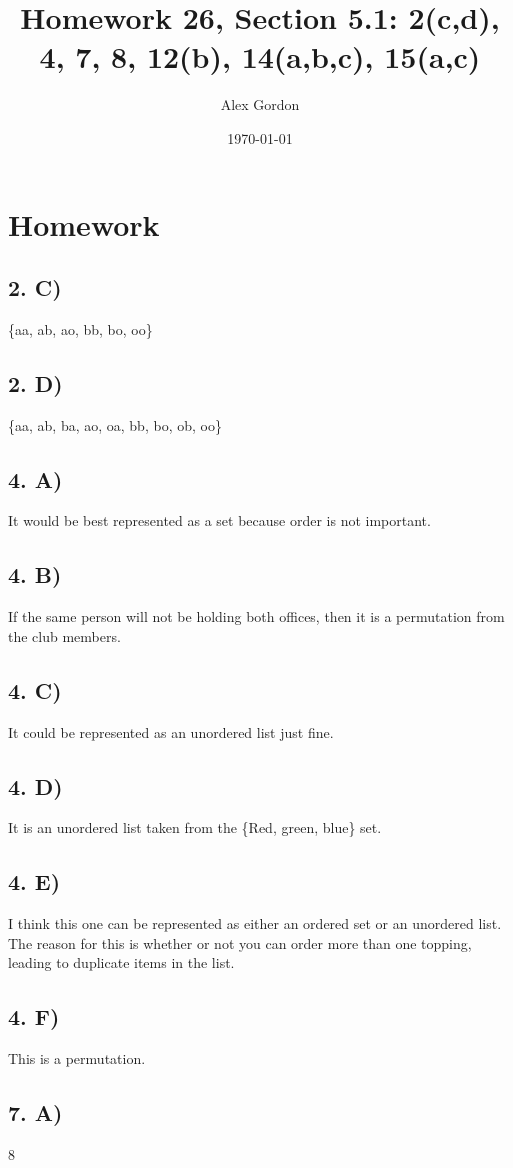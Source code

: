 \documentclass[12]{scrartcl}
\begin{document}
\title{Homework 26, Section 5.1: 2(c,d), 4, 7, 8, 12(b), 14(a,b,c), 15(a,c)}
\author{Alex Gordon}
\date{\today}
\maketitle
\section*{Homework}
\subsection*{2. C)}
\{aa, ab, ao, bb, bo, oo\}
\subsection*{2. D)}
\{aa, ab, ba, ao, oa, bb, bo, ob, oo\}
\subsection*{4. A)}
It would be best represented as a set because order is not important. 
\subsection*{4. B)}
If the same person will not be holding both offices, then it is a permutation from the club members. 
\subsection*{4. C)}
It could be represented as an unordered list just fine. 
\subsection*{4. D)}
It is an unordered list taken from the \{Red, green, blue\} set. 
\subsection*{4. E)}
I think this one can be represented as either an ordered set or an unordered list. The reason for this is whether or not you can order more than one topping, leading to duplicate items in the list. 
\subsection*{4. F)}
This is a permutation. 
\subsection*{7. A)}
8
\end{document}
